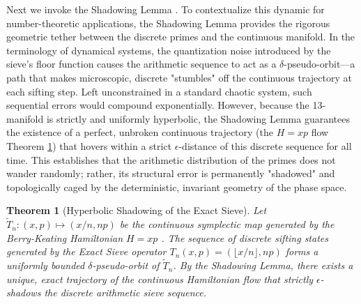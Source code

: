 \documentclass[sn-mathphys-num, pdflatex, referee]{sn-jnl}
\newtheorem{theorem}{Theorem}[section]
\begin{document}
Next we invoke the Shadowing Lemma \cite{katok1995modern}. To contextualize this dynamic for number-theoretic applications, the Shadowing Lemma provides the rigorous geometric tether between the discrete primes and the continuous manifold. In the terminology of dynamical systems, the quantization noise introduced by the sieve's floor function causes the arithmetic sequence to act as a $\delta$-pseudo-orbit—a path that makes microscopic, discrete "stumbles" off the continuous trajectory at each sifting step. Left unconstrained in a standard chaotic system, such sequential errors would compound exponentially. However, because the 13-manifold is strictly and uniformly hyperbolic, the Shadowing Lemma guarantees the existence of a perfect, unbroken continuous trajectory (the $H=xp$ flow Theorem \ref{HS}) that hovers within a strict $\epsilon$-distance of this discrete sequence for all time. This establishes that the arithmetic distribution of the primes does not wander randomly; rather, its structural error is permanently "shadowed" and topologically caged by the deterministic, invariant geometry of the phase space.

\begin{theorem}[Hyperbolic Shadowing of the Exact Sieve]
\label{HS}
Let $\tilde{T}_n: (x,p) \mapsto (x/n, np)$ be the continuous symplectic map generated by the Berry-Keating Hamiltonian $H=xp$ \cite{berry1999riemann}. The sequence of discrete sifting states generated by the Exact Sieve operator $T_n(x,p) = (\lfloor x/n \rfloor, np)$ forms a uniformly bounded $\delta$-pseudo-orbit of $\tilde{T}_n$. By the Shadowing Lemma, there exists a unique, exact trajectory of the continuous Hamiltonian flow that strictly $\epsilon$-shadows the discrete arithmetic sieve sequence.
\end{theorem}
\end{document}
